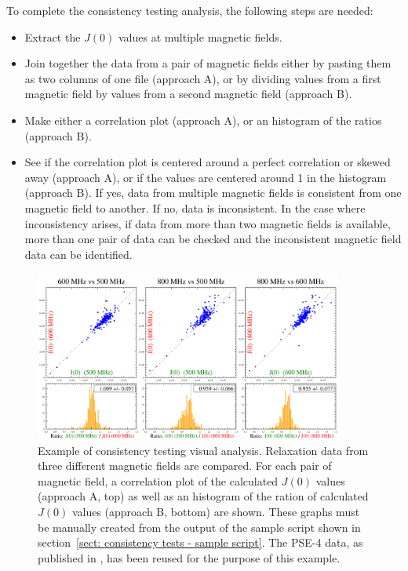 To complete the consistency testing analysis, the following steps are needed:

\begin{itemize}
\item Extract the $J(0)$ values at multiple magnetic fields.
\item Join together the data from a pair of magnetic fields either by pasting them as two columns of one file (approach A), or by dividing values from a first magnetic field by values from a second magnetic field (approach B).
\item Make either a correlation plot (approach A), or an histogram of the ratios (approach B).
\item See if the correlation plot is centered around a perfect correlation or skewed away (approach A), or if the values are centered around 1 in the histogram (approach B).  If yes, data from multiple magnetic fields is consistent from one magnetic field to another.  If no, data is inconsistent.  In the case where inconsistency arises, if data from more than two magnetic fields is available, more than one pair of data can be checked and the inconsistent magnetic field data can be identified.
\end{itemize}

\begin{figure}[h]
\label{fig: consistency analysis}
\centerline{\includegraphics[width=0.9\textwidth, bb=5 2 1244 669]{graphics/analyses/consistency_testing/consistency__J0_PSE-4}}
\caption[Example of consistency testing visual analysis]{Example of consistency testing visual analysis.  Relaxation data from three different magnetic fields are compared.  For each pair of magnetic field, a correlation plot of the calculated $J(0)$ values (approach A, top) as well as an histogram of the ration of calculated $J(0)$ values (approach B, bottom) are shown.  These graphs must be manually created from the output of the sample script shown in section~\ref{sect: consistency tests - sample script}.  The PSE-4 data, as published in \citet{MorinGagne09b}, has been reused for the purpose of this example.}
\end{figure}


